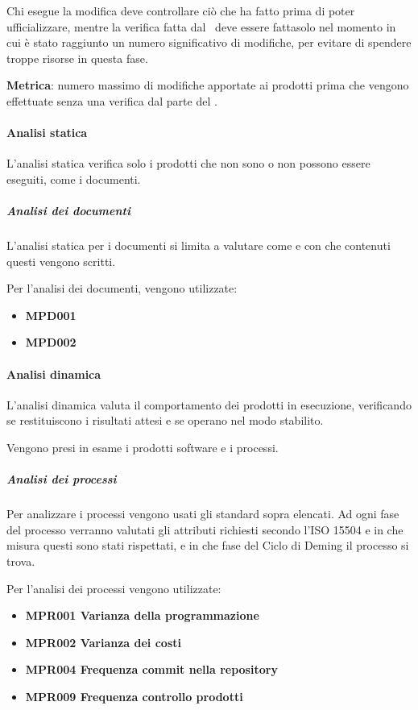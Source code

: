 				Chi esegue la modifica deve controllare ciò che ha fatto prima di poter ufficializzare, mentre la verifica fatta dal \Ver\ deve essere fattasolo nel momento in cui è
				stato raggiunto un numero significativo di modifiche, per evitare di spendere troppe risorse in questa fase.

				\textbf{Metrica}: numero massimo di modifiche apportate ai prodotti prima che vengono effettuate senza una verifica dal parte del \Ver.

			\paragraph{Analisi statica}
			L'analisi statica verifica solo i prodotti che non sono o non possono essere eseguiti, come i documenti.

				\subparagraph{Analisi dei documenti}
				L'analisi statica per i documenti si limita a valutare come e con che contenuti questi vengono scritti.

				Per l'analisi dei documenti, vengono utilizzate:

				\begin{itemize}
					\item \textbf{MPD001}
					\item \textbf{MPD002}
				\end{itemize}

			\paragraph{Analisi dinamica}
			L'analisi dinamica valuta il comportamento dei prodotti in esecuzione, verificando se restituiscono i risultati attesi e se operano nel modo stabilito.

			Vengono presi in esame i prodotti software e i processi.

				\subparagraph{Analisi dei processi}
				Per analizzare i processi vengono usati gli standard sopra elencati. Ad ogni fase del processo verranno valutati gli attributi richiesti secondo l'ISO 15504
				e in che misura questi sono stati rispettati, e in che fase del Ciclo di Deming il processo si trova.

				Per l'analisi dei processi vengono utilizzate:

				\begin{itemize}
					\item \textbf{MPR001 Varianza della programmazione}
					\item \textbf{MPR002 Varianza dei costi}
					\item \textbf{MPR004 Frequenza commit nella repository}
					\item \textbf{MPR009 Frequenza controllo prodotti}
				\end{itemize}





